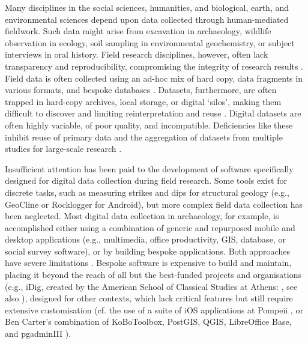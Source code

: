 \documentclass[preprint,12pt, a4paper]{elsarticle}
\begin{document}
Many disciplines in the social sciences, humanities, and biological, earth, and environmental sciences depend upon data collected through human-mediated fieldwork. Such data might arise from excavation in archaeology, wildlife observation in ecology, soil sampling in environmental geochemistry, or subject interviews in oral history. Field research disciplines, however, often lack transparency and reproducibility, compromising the integrity of research results \cite{McNutt2016-dg}. Field data is often collected using an ad-hoc mix of hard copy, data fragments in various formats, and bespoke databases \cite{Borgman2015-zg, Kansa2010-qx, Kintigh2006-uf, Snow2006-nu}. Datasets, furthermore, are often trapped in hard-copy archives, local storage, or digital `silos', making them difficult to discover and limiting reinterpretation and reuse \cite{Blanke2010-ou}. Digital datasets are often highly variable, of poor quality, and incompatible. Deficiencies like these inhibit reuse of primary data and the aggregation of datasets from multiple studies for large-scale research \cite{Kintigh2006-uf, Kintigh2014-ks, McNutt2016-dg}. 

Insufficient attention has been paid to the development of software specifically designed for digital data collection during field research. Some tools exist for discrete tasks, such as measuring strikes and dips for structural geology (e.g., GeoCline or Rocklogger for Android), but more complex field data collection has been neglected. Most digital data collection in archaeology, for example, is accomplished either using a combination of generic and repurposed mobile and desktop applications (e.g., multimedia, office productivity, GIS, database, or social survey software), or by building bespoke applications. Both approaches have severe limitations \cite{Sobotkova2016-mx}. Bespoke software is expensive to build and maintain, placing it beyond the reach of all but the best-funded projects and organisations (e.g., iDig, created by the American School of Classical Studies at Athens: \cite{American_School_of_Classical_Studies_in_Greece_undated-lm, Brown_University2016-cu}, see also \cite{Fee2016-nn}), designed for other contexts, which lack critical features but still require extensive customisation (cf. the use of a suite of iOS applications at Pompeii \cite{Ellis2016-vh}, or Ben Carter's combination of KoBoToolbox, PostGIS, QGIS, LibreOffice Base, and pgadminIII \cite{Carter2016-jm}). 
\end{document}
